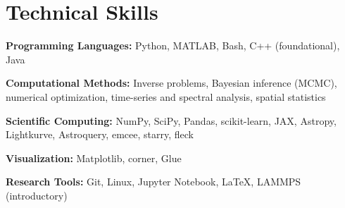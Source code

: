 \section{Technical Skills}

\begin{compact}[2pt]
\raggedright
\textbf{Programming Languages:} Python, MATLAB, Bash, C++ (foundational), Java\par
\textbf{Computational Methods:} Inverse problems, Bayesian inference (MCMC), numerical optimization, time-series and spectral analysis, spatial statistics\par
\textbf{Scientific Computing:} NumPy, SciPy, Pandas, scikit-learn, JAX, Astropy, Lightkurve, Astroquery, emcee, starry, fleck\par
\textbf{Visualization:} Matplotlib, corner, Glue\par
\textbf{Research Tools:} Git, Linux, Jupyter Notebook, \LaTeX, LAMMPS (introductory)\par
\end{compact}
